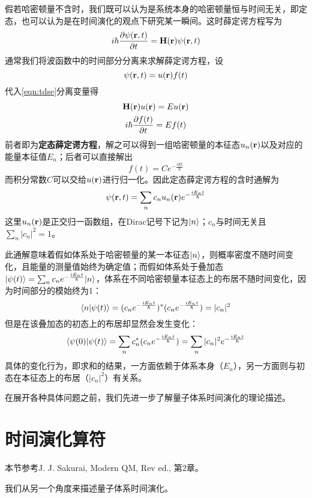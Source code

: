 假若哈密顿量不含时，我们既可以认为是系统本身的哈密顿量恒与时间无关，即定态，也可以认为是在时间演化的观点下研究某一瞬间。这时薛定谔方程写为
\begin{equation}\label{eqn:tdse}
i\hbar \dfrac{\partial \psi(\bm{\mathrm{r}},t)}{\partial t}=\bm{\mathrm{H}}(\bm{\mathrm{r}}) \psi(\bm{\mathrm{r}},t)
\end{equation}
通常我们将波函数中的时间部分分离来求解薛定谔方程，设
\begin{equation}\label{key}
\psi(\bm{\mathrm{r}},t)=u(\bm{\mathrm{r}})f(t)
\end{equation}
代入\eqref{eqn:tdse}分离变量得
\begin{gather}
\bm{\mathrm{H}}(\bm{\mathrm{r}}) u(\bm{\mathrm{r}})=E u(\bm{\mathrm{r}})\label{eqn:TISE}\\
i\hbar \dfrac{\partial f(t)}{\partial t}=Ef(t)\label{eqn:timepart}
\end{gather}
前者即为\textbf{定态薛定谔方程}，解之可以得到一组哈密顿量的本征态$ u_n(\bm{\mathrm{r}}) $以及对应的能量本征值$ E_n $；后者可以直接解出
\begin{equation}\label{key}
f(t)=Ce^{-\frac{iEt}{\hbar}}
\end{equation}
而积分常数$ C $可以交给$ u(\bm{\mathrm{r}}) $进行归一化。因此定态薛定谔方程的含时通解为
\begin{equation}\label{key}
\psi(\bm{\mathrm{r}},t)=\sum_nc_nu_n(\bm{\mathrm{r}})e^{-\frac{iE_nt}{\hbar}}
\end{equation}
这里$ u_n(\bm{\mathrm{r}}) $是正交归一函数组，在Dirac记号下记为$ |n\rangle $；$ c_n $与时间无关且$ \sum_n |c_n|^2=1 $。

此通解意味着假如体系处于哈密顿量的某一本征态$ |n\rangle $，则概率密度不随时间变化，且能量的测量值始终为确定值；而假如体系处于叠加态$ |\psi(t)\rangle=\sum_nc_ne^{-\frac{iE_nt}{\hbar}}|n\rangle $，体系在不同哈密顿量本征态上的布居不随时间变化，因为时间部分的模始终为1：
\begin{equation}\label{key}
\langle n|\psi(t)\rangle=(c_ne^{-\frac{iE_nt}{\hbar}})^*(c_ne^{-\frac{iE_nt}{\hbar}})=|c_n|^2
\end{equation} 
但是在该叠加态的初态上的布居却显然会发生变化：
\begin{equation}\label{key}
\langle\psi(0)|\psi(t)\rangle=\sum_nc_n^*(c_ne^{-\frac{iE_nt}{\hbar}})=\sum_n|c_n|^2e^{-\frac{iE_nt}{\hbar}}
\end{equation}
具体的变化行为，即求和的结果，一方面依赖于体系本身（$ E_n $），另一方面则与初态在本征态上的布居（$ |c_n|^2 $）有关系。

在展开各种具体问题之前，我们先进一步了解量子体系时间演化的理论描述。

\section{时间演化算符}
\begin{framed}
本节参考J. J. Sakurai, Modern QM, Rev ed., 第2章。
\end{framed}
我们从另一个角度来描述量子体系时间演化。

